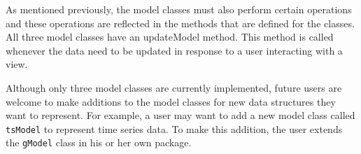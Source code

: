 \documentclass[11pt]{article}
\newcommand{\Rfunction}[1]{{\textsf{#1}}}
\newcommand{\Rpackage}[1]{{\textit{#1}}}
\newcommand{\Rslot}[1]{\textsl{#1}}
\newcommand{\Rclass}[1]{\texttt{#1}}
\begin{document}





As mentioned previously, the model classes must also perform certain
operations and these operations are reflected in the methods that are
defined for the classes.  All three model classes have an
\Rfunction{updateModel} method.  This method is called whenever the
data need to be updated in response to a user interacting with a view.

Although only three model classes are currently implemented, future
users are welcome to make additions to the model classes for new data
structures they want to represent.  For example, a user may want to add a new
model class called \Rclass{tsModel} to represent time series data.
To make this addition, the user extends the \Rclass{gModel} class in his or
her own package. 
\end{document}
